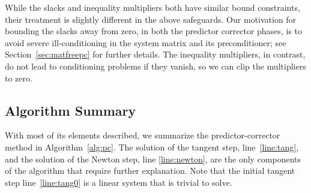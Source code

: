 While the slacks and inequality multipliers both have similar bound constraints, their treatment is
slightly different in the above safeguards.  Our motivation for bounding the
slacks away from zero, in both the predictor corrector phases, is to avoid
severe ill-conditioning in the system matrix and its preconditioner; see
Section~\ref{sec:matfreepc} for further details.  The inequality multipliers, in contrast,
do not lead to conditioning problems if they vanish, so we can clip the
multipliers to zero.

\subsection{Algorithm Summary}

With most of its elements described, we summarize the predictor-corrector method
in Algorithm~\ref{alg:pc}.  The solution of the tangent step,
line~\ref{line:tang}, and the solution of the Newton step, line
\ref{line:newton}, are the only components of the algorithm that require further
explanation.  Note that the initial tangent step line~\ref{line:tang0} is a linear system that 
is trivial to solve. %
\\
\LinesNumberedHidden
